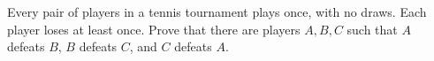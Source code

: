 Every pair of players in a tennis tournament plays once, with no draws. Each player loses at least once. Prove that there are players $A,B,C$ such that $A$ defeats $B$, $B$ defeats $C$, and $C$ defeats $A$.

